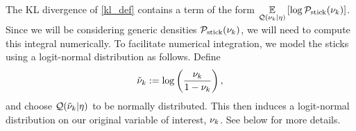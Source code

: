 The KL divergence of \eqref{kl_def} contains a term of the form $\underset{\mathcal{Q}(\nu_{k}
\vert \eta)}{\mathbb{E}}\left[\log \mathcal{P}_{\mathrm{stick}}(\nu_{k})\right]$.  Since we will be considering generic
densities $\mathcal{P}_{\mathrm{stick}}(\nu_{k})$, we will need to compute this integral numerically.
To facilitate numerical integration, we model the sticks using a logit-normal
distribution as follows.  Define
%
\begin{align*}
%
\lnuk := \log\left(\frac{\nuk}{1 - \nuk}\right),
%
\end{align*}
%
and choose $\mathcal{Q}(\tilde{\nu}_k \vert \eta)$ to be normally distributed.  This then
induces a logit-normal distribution on our original variable of interest,
$\nu_{k}$.  See  below for more details.




\hrulefill




%
%
%

